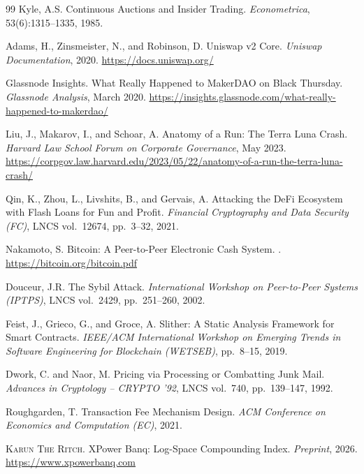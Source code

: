 \documentclass[10pt,a4paper,twocolumn]{article}
\begin{document}
\begin{thebibliography}{99}
Kyle, A.S.
\newblock Continuous Auctions and Insider Trading.
\newblock \emph{Econometrica}, 53(6):1315--1335, 1985.


Adams, H., Zinsmeister, N., and Robinson, D.
\newblock Uniswap v2 Core.
\newblock \emph{Uniswap Documentation}, 2020.
\newblock \url{https://docs.uniswap.org/}

Glassnode Insights.
\newblock What Really Happened to MakerDAO on Black Thursday.
\newblock \emph{Glassnode Analysis}, March 2020.
\newblock \url{https://insights.glassnode.com/what-really-happened-to-makerdao/}

Liu, J., Makarov, I., and Schoar, A.
\newblock Anatomy of a Run: The Terra Luna Crash.
\newblock \emph{Harvard Law School Forum on Corporate Governance}, May 2023.
\newblock \url{https://corpgov.law.harvard.edu/2023/05/22/anatomy-of-a-run-the-terra-luna-crash/}

Qin, K., Zhou, L., Livshits, B., and Gervais, A.
\newblock Attacking the DeFi Ecosystem with Flash Loans for Fun and Profit.
\newblock \emph{Financial Cryptography and Data Security (FC)}, LNCS vol.~12674, pp.~3--32, 2021.

Nakamoto, S.
\newblock Bitcoin: A Peer-to-Peer Electronic Cash System.
.
\newblock \url{https://bitcoin.org/bitcoin.pdf}

Douceur, J.R.
\newblock The Sybil Attack.
\newblock \emph{International Workshop on Peer-to-Peer Systems (IPTPS)}, LNCS vol.~2429, pp.~251--260, 2002.

Feist, J., Grieco, G., and Groce, A.
\newblock Slither: A Static Analysis Framework for Smart Contracts.
\newblock \emph{IEEE/ACM International Workshop on Emerging Trends in Software Engineering for Blockchain (WETSEB)}, pp.~8--15, 2019.

Dwork, C. and Naor, M.
\newblock Pricing via Processing or Combatting Junk Mail.
\newblock \emph{Advances in Cryptology -- CRYPTO '92}, LNCS vol.~740, pp.~139--147, 1992.

Roughgarden, T.
\newblock Transaction Fee Mechanism Design.
\newblock \emph{ACM Conference on Economics and Computation (EC)}, 2021.

\textsc{Karun The Ritch}.
\newblock XPower Banq: Log-Space Compounding Index.
\newblock \emph{Preprint}, 2026.
\newblock \url{https://www.xpowerbanq.com}


\end{thebibliography}
\end{document}
